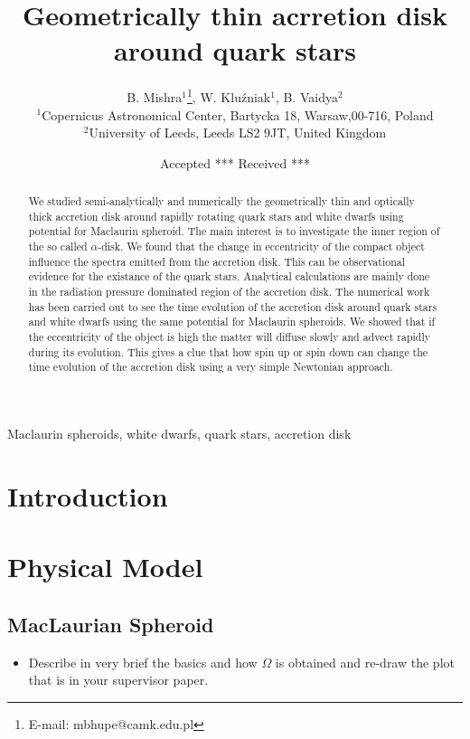 \documentclass[useAMS,usenatbib]{mn2e}
\title[Geometrically thin acrretion disk around white dwarfs and quark stars]{Geometrically thin acrretion disk around quark stars}
\author[B. Mishra, B. Vaidya and W. Kluzniak]{B. Mishra$^{1}$\thanks{E-mail:
mbhupe@camk.edu.pl}, W. Klu\'zniak$^{1}$, B. Vaidya$^{2}$\\
$^{1}$Copernicus Astronomical Center, Bartycka 18, Warsaw,00-716, Poland\\
$^{2}$University of Leeds, Leeds LS2 9JT, United Kingdom}
\begin{document}
\date{Accepted *** Received ***}

\pagerange{\pageref{firstpage}--\pageref{lastpage}} 

\maketitle

\label{firstpage}

\begin{abstract}
We studied semi-analytically and numerically the geometrically thin and optically thick accretion disk around rapidly rotating quark stars and white dwarfs using potential for Maclaurin spheroid. The main interest is to investigate the inner region of the so called $\alpha$-disk. We found that the change in eccentricity of the compact object influence the spectra emitted from the accretion disk. This can be observational evidence for the existance of the quark stars. Analytical calculations are mainly done in the radiation pressure dominated region of the accretion disk. The numerical work has been carried out to see the time evolution of the accretion disk around quark stars and white dwarfs using the same potential for Maclaurin spheroids. We showed that if the eccentricity of the object is high the matter will diffuse slowly and advect rapidly during its evolution. This gives a clue that how spin up or spin down can change the time evolution of the accretion disk using a very simple Newtonian approach.  

\end{abstract}

\begin{keywords}
Maclaurin spheroids, white dwarfs, quark stars, accretion disk
\end{keywords}

\section{Introduction}

\section{Physical Model}
\subsection{MacLaurian Spheroid}
\begin{itemize}
\item Describe in very brief the basics and how $\Omega$ is obtained
  and re-draw the plot that is in your supervisor paper. 
\end{itemize}
\end{document}
